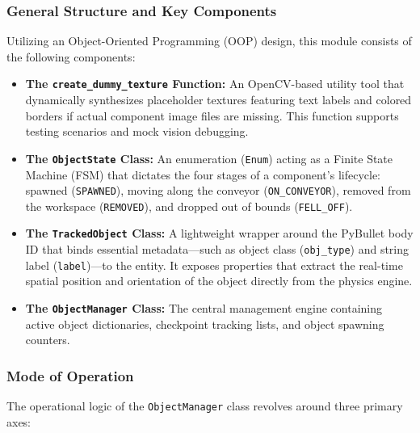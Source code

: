 \documentclass{article}
\begin{document}
\subsubsection{General Structure and Key Components}
Utilizing an Object-Oriented Programming (OOP) design, this module consists of the following components:

\begin{itemize}
	\item \textbf{The \texttt{create\_dummy\_texture} Function:} An OpenCV-based utility tool that dynamically synthesizes placeholder textures featuring text labels and colored borders if actual component image files are missing. This function supports testing scenarios and mock vision debugging.
	\item \textbf{The \texttt{ObjectState} Class:} An enumeration (\texttt{Enum}) acting as a Finite State Machine (FSM) that dictates the four stages of a component's lifecycle: spawned (\texttt{SPAWNED}), moving along the conveyor (\texttt{ON\_CONVEYOR}), removed from the workspace (\texttt{REMOVED}), and dropped out of bounds (\texttt{FELL\_OFF}).
	\item \textbf{The \texttt{TrackedObject} Class:} A lightweight wrapper around the PyBullet body ID that binds essential metadata—such as object class (\texttt{obj\_type}) and string label (\texttt{label})—to the entity. It exposes properties that extract the real-time spatial position and orientation of the object directly from the physics engine.
	\item \textbf{The \texttt{ObjectManager} Class:} The central management engine containing active object dictionaries, checkpoint tracking lists, and object spawning counters.
\end{itemize}

\subsubsection{Mode of Operation}
The operational logic of the \texttt{ObjectManager} class revolves around three primary axes:
\end{document}
